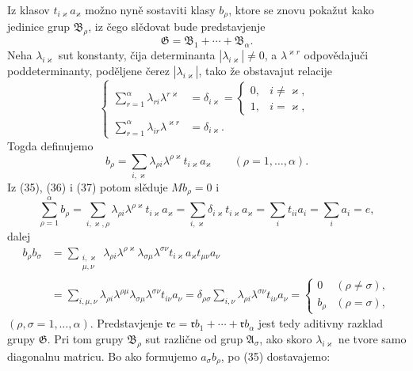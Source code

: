 \documentclass[11pt]{article}
\begin{document}
Iz klasov \(t_{i\varkappa}a_\varkappa\) možno nyně sostaviti klasy \(b_\rho\), ktore se znovu pokažut kako jedinice grup \(\mathfrak B_\rho\), iz čego slědovat bude predstavjenje
\[
 \mathfrak G=\mathfrak B_1+\cdots+\mathfrak B_\alpha.
\]
Neha \(\lambda_{i\varkappa}\) sut konstanty, čija determinanta \(|\lambda_{i\varkappa}|\ne0\), a \(\lambda^{\varkappa r}\) odpovědajuči poddeterminanty, poděljene čerez \(|\lambda_{i\varkappa}|\), tako že obstavajut relacije
\begin{equation}
\left\{
\begin{aligned}
 \sum_{r=1}^{\alpha}\lambda_{ri}\lambda^{r\varkappa}&=\delta_{i\varkappa}=\begin{cases}0,&i\ne\varkappa,\\1,&i=\varkappa,
 \end{cases}\\
 \sum_{r=1}^{\alpha}\lambda_{ir}\lambda^{\varkappa r}&=\delta_{i\varkappa}.
\end{aligned}\right.
\tag{36}
\end{equation}
Togda definujemo
\begin{equation}
 b_\rho=\sum_{i,\varkappa}\lambda_{\rho i}\lambda^{\rho\varkappa}t_{i\varkappa}a_\varkappa
 \qquad(\rho=1,
\ldots,\alpha).
\tag{37}
\end{equation}
Iz (35), (36) i (37) potom slěduje \(Mb_\rho=0\) i
\begin{equation}
 \sum_{\rho=1}^{\alpha}b_\rho
 =\sum_{i,\varkappa,\rho}\lambda_{\rho i}\lambda^{\rho\varkappa}t_{i\varkappa}a_\varkappa
 =\sum_{i,\varkappa}\delta_{i\varkappa}t_{i\varkappa}a_\varkappa
 =\sum_i t_{ii}a_i=\sum_i a_i=e,
\tag{38}
\end{equation}
dalej
\[
\begin{aligned}
 b_\rho b_\sigma
 &=\sum_{\substack{i,\varkappa\\ \mu,\nu}}
  \lambda_{\rho i}\lambda^{\rho\varkappa}\lambda_{\sigma\mu}\lambda^{\sigma\nu}
  t_{i\varkappa}a_\varkappa t_{\mu\nu}a_\nu \\
 &=\sum_{i,\mu,\nu}\lambda_{\rho i}\lambda^{\rho\mu}\lambda_{\sigma\mu}\lambda^{\sigma\nu}t_{i\nu}a_\nu
 =\delta_{\rho\sigma}\sum_{i,\nu}\lambda_{\rho i}\lambda^{\sigma\nu}t_{i\nu}a_\nu
 =\begin{cases}0&(\rho\ne\sigma),\\ b_\rho&(\rho=\sigma),\end{cases}
\end{aligned}
\]
\((\rho,\sigma=1,
\ldots,\alpha)\). Predstavjenje \(\mathfrak r e=\mathfrak r b_1+\cdots+\mathfrak r b_\alpha\) jest tedy aditivny razklad grupy \(\mathfrak G\). Pri tom grupy \(\mathfrak B_\rho\) sut različne od grup \(\mathfrak A_\sigma\), ako skoro \(\lambda_{i\varkappa}\) ne tvore samo diagonalnu matricu. Bo ako formujemo \(a_\sigma b_\rho\), po (35) dostavajemo:
\end{document}
